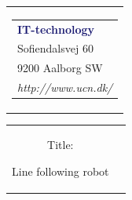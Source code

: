 


% 
\thispagestyle{empty}
\begin{nopagebreak}
{\samepage 

\begin{tabular}{r}
\parbox{\textwidth}{  
\hfill \hspace{2cm} \parbox{8cm}{\begin{tabular}{l} %
{\small \textbf{\textcolor{MidnightBlue}{IT-technology}}}\\ 
{\small \textcolor{NavyBlue}{Sofiendalsvej 60}} \\
{\small \textcolor{NavyBlue}{9200 Aalborg SW}} \\
{\small \textcolor{NavyBlue}{\emph{http://www.ucn.dk/}}}
\end{tabular}}}
\end{tabular}

\begin{tabular}{cc}
\parbox{7cm}{
\begin{description}

\item { Title:} 

Line following robot

\end{description}

\parbox{8cm}{

}}
\end{tabular}}
\end{nopagebreak}
